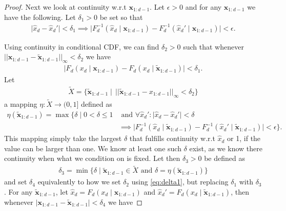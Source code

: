 \begin{proof}
    Next we look at continuity w.r.t \(\bm x_{1:d-1}\). Let \(\epsilon > 0\) and for any \(\bm x_{1:d-1}\) we have the following. Let \(\delta_1 > 0\) be set so that 
    \begin{align*}
        \lvert \hat{x}_d - \hat{x}_d'\rvert < \delta_1 \implies \lvert F_d^{-1}(\hat{x}_d \mid \bm x_{1:d-1}) - F_d^{-1}(\hat{x}_d' \mid  \bm x_{1:d-1})\rvert <\epsilon.
    \end{align*}

    Using continuity in conditional CDF, we can find \(\delta_2 > 0\) such that whenever \(\lvert\lvert \bm x_{1:d-1} - \tilde{\bm x}_{1:d-1} \rvert\rvert_{\infty} < \delta_2\) we have
    \begin{align}\label{eq:delta1}
        \lvert F_d(x_d \mid \bm x_{1:d-1}) - F_d(x_d \mid \tilde{\bm x}_{1:d-1})\rvert < \delta_1.
    \end{align}
    Let 
    \begin{align*}
        \tilde X = \{\tilde{\bm x}_{1:d-1} \mid \, \lvert\lvert \tilde{\bm x}_{1:d-1} - x_{1:d-1} \rvert\rvert_{\infty} < \delta_2\}
    \end{align*}
    a mapping \(\eta\colon \tilde X \to (0, 1]\) defined as 
    \begin{align*}
        \eta(\tilde{\bm x}_{1:d-1}) = \max\{\delta \mid 0< \delta \leq 1 &\text{ and } \forall \hat{x}_d':\lvert \hat{x}_d - \hat{x}_d' \rvert < \delta\\
                                    &\implies \lvert F_d^{-1}(\hat{x}_d \mid \tilde{\bm x}_{1:d-1}) - 
        F_d^{-1}(\hat{x}_d' \mid \tilde{\bm x}_{1:d-1}) \rvert < \epsilon\}.
    \end{align*}
    This mapping simply take the largest \(\delta\) that fulfills continuity w.r.t \(\hat{x}_d\) or 1, if the value can be larger than one. We know at least one
    such \(\delta\) exist, as we know there continuity when what we condition on is fixed.
    Let then \(\delta_3 > 0\) be defined as
    \begin{align*}
        \delta_3 = \min\{\delta \mid \tilde{\bm x}_{1:d-1} \in \tilde X \text{ and } \delta = \eta(\tilde{\bm x}_{1:d-1})\}
    \end{align*}
    and set \(\delta_4\) equivalently to how we set \(\delta_2\) using \cref{eq:delta1}, but replacing \(\delta_1\) with \(\delta_3\). 
    For any \(\tilde{\bm x}_{1:d-1}\), let \(\hat{x}_d = F_d(x_d \mid \bm x_{1:d-1})\) and \(\hat{x}_d' = F_d(x_d\mid \tilde{\bm x}_{1:d-1})\), then
    whenever \(\lvert \bm x_{1:d-1} - \tilde{\bm x}_{1:d-1} \rvert < \delta_4\) we have

\end{proof}
